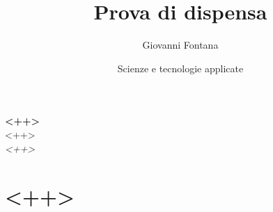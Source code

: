 \documentclass{article}
\title{Prova di dispensa}
\author{Giovanni Fontana}
\date{Scienze e tecnologie applicate}
\begin{document}
\begin{center}
  \textbf{<++>} \\ \vspace{1cm} %
  <++> \\ \vspace{0.4cm}  %
  \textit{<++>} %
\end{center}

\section{<++>}


\end{document}
